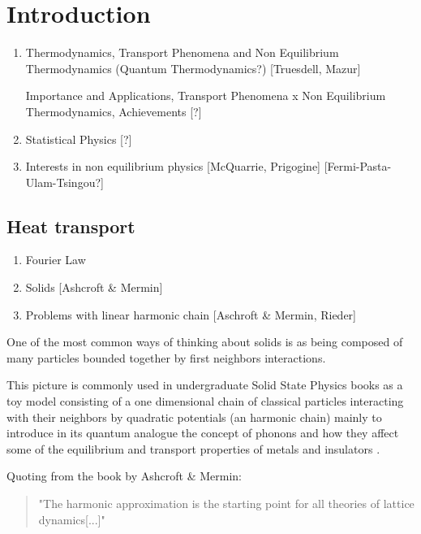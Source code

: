 
\chapter{Introduction}

\begin{enumerate}
	\item Thermodynamics, Transport Phenomena and Non Equilibrium Thermodynamics (Quantum Thermodynamics?) [Truesdell, Mazur]
	
	Importance and Applications, Transport Phenomena x Non Equilibrium Thermodynamics, Achievements [?]
	
	\item Statistical Physics [?]
	
	\item Interests in non equilibrium physics [McQuarrie, Prigogine]
	[Fermi-Pasta-Ulam-Tsingou?]
	
\end{enumerate}

\section{Heat transport}

\begin{enumerate}
	\item Fourier Law
	
	\item Solids [Ashcroft \& Mermin]
	
	\item Problems with linear harmonic chain [Aschroft \& Mermin, Rieder]
\end{enumerate}

One of the most common ways of thinking about solids is as being composed of many particles bounded together by first neighbors interactions.

This picture is commonly used in undergraduate Solid State Physics books as a toy model consisting of a one dimensional chain of classical particles interacting with their neighbors by quadratic potentials (an harmonic chain) mainly to introduce in its quantum analogue the concept of phonons \cite{simonOxfordSolid2017} and how they affect some of the equilibrium and transport properties of metals and insulators \cite{ashcroftSolidState1976}.


Quoting from the book by Ashcroft \& Mermin:
\begin{quote}
	"The harmonic approximation is the starting point for all theories of lattice dynamics[...]"
\end{quote}

